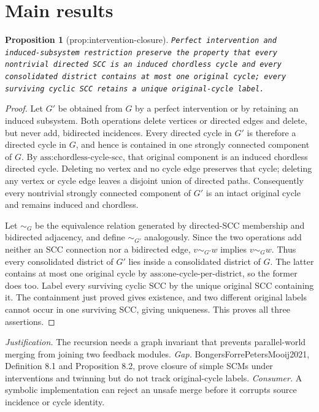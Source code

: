 \documentclass{article}
\newtheorem{proposition}{Proposition}
\begin{document}
\section{Main results}

\begin{proposition}[prop:intervention-closure]\label{prop:intervention-closure}
\texttt{Perfect intervention and induced-\allowbreak{}subsystem restriction preserve the property that every nontrivial directed SCC is an induced chordless cycle and every consolidated district contains at most one original cycle;\allowbreak{} every surviving cyclic SCC retains a unique original-\allowbreak{}cycle label.}
\end{proposition}
\begin{proof}
Let \(G'\) be obtained from \(G\) by a perfect intervention or by retaining an induced subsystem.  Both operations delete vertices or directed edges and delete, but never add, bidirected incidences.  Every directed cycle in \(G'\) is therefore a directed cycle in \(G\), and hence is contained in one strongly connected component of \(G\).  By \(\text{ass:chordless-cycle-scc}\), that original component is an induced chordless directed cycle.  Deleting no vertex and no cycle edge preserves that cycle; deleting any vertex or cycle edge leaves a disjoint union of directed paths.  Consequently every nontrivial strongly connected component of \(G'\) is an intact original cycle and remains induced and chordless.

Let \(\sim_G\) be the equivalence relation generated by directed-SCC membership and bidirected adjacency, and define \(\sim_{G'}\) analogously.  Since the two operations add neither an SCC connection nor a bidirected edge, \(v\sim_{G'}w\) implies \(v\sim_Gw\).  Thus every consolidated district of \(G'\) lies inside a consolidated district of \(G\).  The latter contains at most one original cycle by \(\text{ass:one-cycle-per-district}\), so the former does too.  Label every surviving cyclic SCC by the unique original SCC containing it.  The containment just proved gives existence, and two different original labels cannot occur in one surviving SCC, giving uniqueness.  This proves all three assertions.
\end{proof}
\par\smallskip\noindent \textit{Justification.} The recursion needs a graph invariant that prevents parallel-world merging from joining two feedback modules. \textit{Gap.} BongersForrePetersMooij2021, Definition 8.1 and Proposition 8.2, prove closure of simple SCMs under interventions and twinning but do not track original-cycle labels. \textit{Consumer.} A symbolic implementation can reject an unsafe merge before it corrupts source incidence or cycle identity.
\end{document}
